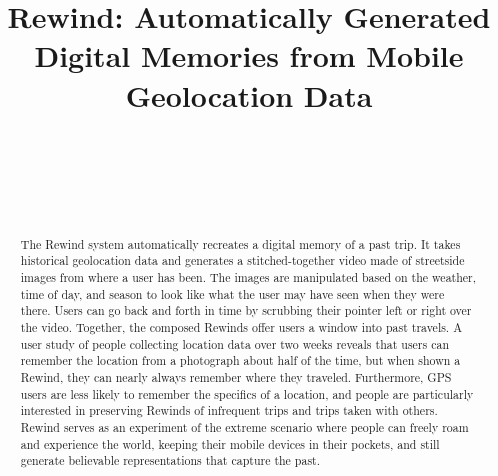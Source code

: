 \documentclass{sigchi}
\begin{document}
\title{Rewind: Automatically Generated\\Digital Memories from Mobile Geolocation Data}

\author{
  \alignauthor {~}\\
    \affaddr{~}\\
    \affaddr{~}\\
    \email{~}\\
}


\maketitle

\begin{abstract}
The Rewind system automatically recreates a digital memory of a past trip. It takes historical geolocation data and generates a stitched-together video made of streetside images from where a user has been. The images are manipulated based on the weather, time of day, and season to look like what the user may have seen when they were there. Users can go back and forth in time by scrubbing their pointer left or right over the video. Together, the composed Rewinds offer users a window into past travels. A user study of people collecting location data over two weeks reveals that users can remember the location from a photograph about half of the time, but when shown a Rewind, they can nearly always remember where they traveled. Furthermore, GPS users are less likely to remember the specifics of a location, and people are particularly interested in preserving Rewinds of infrequent trips and trips taken with others. Rewind serves as an experiment of the extreme scenario where people can freely roam and experience the world, keeping their mobile devices in their pockets, and still generate believable representations that capture the past.
\end{abstract}
\end{document}
